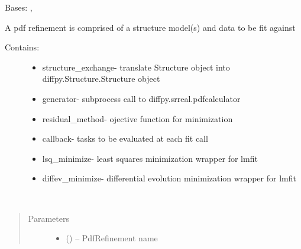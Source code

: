 \documentclass[letterpaper,10pt,english]{sphinxmanual}
\begin{document}
\begin{fulllineitems}
\label{\detokenize{rst/pairdistributionfunction:mstack.pairdistributionfunction.PdfRefinement}}
Bases: {\hyperref[\detokenize{rst/utilities:mstack.utilities.UpdateMethods}]{}}, {\hyperref[\detokenize{rst/utilities:mstack.utilities.MergeParams}]{}}

A pdf refinement is comprised of a structure model(s) and data to be fit against
\begin{description}
\item[{Contains:}] \leavevmode\begin{itemize}
\item {} 
structure\_exchange- translate Structure object into diffpy.Structure.Structure object

\item {} 
generator- subprocess call to diffpy.srreal.pdfcalculator

\item {} 
residual\_method- ojective function for minimization

\item {} 
callback- tasks to be evaluated at each fit call

\item {} 
lsq\_minimize- least squares minimization wrapper for lmfit

\item {} 
diffev\_minimize- differential evolution minimization wrapper for lmfit

\end{itemize}

\end{description}

\begin{fulllineitems}
\label{\detokenize{rst/pairdistributionfunction:mstack.pairdistributionfunction.PdfRefinement.__init__}}~\begin{quote}\begin{description}
\item[{Parameters}] \leavevmode\begin{itemize}
\item {} 
 () -- PdfRefinement name


\end{itemize}
\end{description}
\end{quote}
\end{fulllineitems}
\end{fulllineitems}
\end{document}
